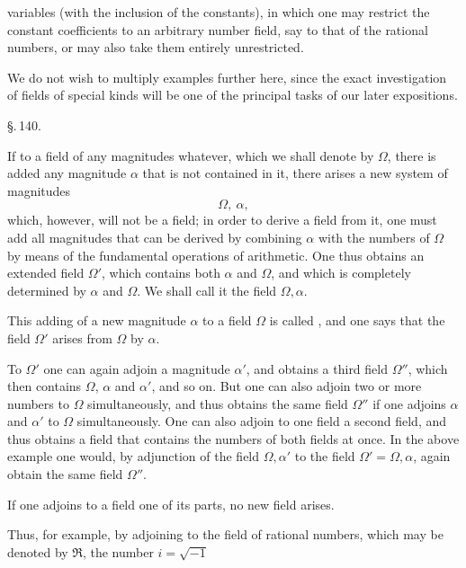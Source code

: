 variables (with the inclusion of the constants), in which one may restrict the constant coefficients to an arbitrary number field, say to that of the rational numbers, or may also take them entirely unrestricted.

We do not wish to multiply examples further here, since the exact investigation of fields of special kinds will be one of the principal tasks of our later expositions.

\begin{center}
\S.\,140.

\end{center}

If to a field of any magnitudes whatever, which we shall denote by $\Omega$, there is added any magnitude $\alpha$ that is not contained in it, there arises a new system of magnitudes
\[
\Omega,\ \alpha,
\]
which, however, will not be a field; in order to derive a field from it, one must add all magnitudes that can be derived by combining $\alpha$ with the numbers of $\Omega$ by means of the fundamental operations of arithmetic. One thus obtains an extended field $\Omega'$, which contains both $\alpha$ and $\Omega$, and which is completely determined by $\alpha$ and $\Omega$. We shall call it the field $\Omega, \alpha$.

This adding of a new magnitude $\alpha$ to a field $\Omega$ is called , and one says that the field $\Omega'$ arises from $\Omega$ by  $\alpha$.

To $\Omega'$ one can again adjoin a magnitude $\alpha'$, and obtains a third field $\Omega''$, which then contains $\Omega$, $\alpha$ and $\alpha'$, and so on. But one can also adjoin two or more numbers to $\Omega$ simultaneously, and thus obtains the same field $\Omega''$ if one adjoins $\alpha$ and $\alpha'$ to $\Omega$ simultaneously. One can also adjoin to one field a second field, and thus obtains a field that contains the numbers of both fields at once. In the above example one would, by adjunction of the field $\Omega, \alpha'$ to the field $\Omega' = \Omega, \alpha$, again obtain the same field $\Omega''$.

If one adjoins to a field one of its parts, no new field arises.

Thus, for example, by adjoining to the field of rational numbers, which may be denoted by $\mathfrak{R}$, the number $i=\sqrt{-1}$
